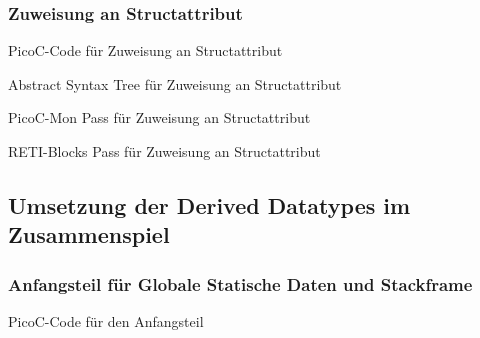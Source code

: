 \subsubsection{Zuweisung an Structattribut}
\begin{code}
  \centering
  \caption{PicoC-Code für Zuweisung an Structattribut}
  \label{code:picoc_code_für_zuweisung_an_structattribut}
\end{code}

\begin{code}
  \centering
  \caption{Abstract Syntax Tree für Zuweisung an Structattribut}
  \label{code:abstract_syntax_tree_für_zuweisung_an_structattribut}
\end{code}

\begin{code}
  \centering
  \caption{PicoC-Mon Pass für Zuweisung an Structattribut}
  \label{code:picoc_mon_pass_für_zuweisung_an_structattribut}
\end{code}

\begin{code}
  \centering
  \caption{RETI-Blocks Pass für Zuweisung an Structattribut}
  \label{code:reti_blocks_pass_für_zuweisung_an_structattribut}
\end{code}

\subsection{Umsetzung der Derived Datatypes im Zusammenspiel}
\subsubsection{Anfangsteil für Globale Statische Daten und Stackframe}
\label{sec:einleitungsteil_für_globale_statische_daten_und_stackframe}
\begin{code}
  \centering
  \caption{PicoC-Code für den Anfangsteil}
  \label{code:picoc_code_einleitungsteil}
\end{code}

